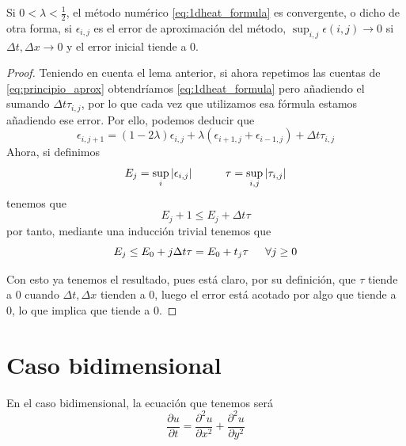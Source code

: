 \begin{teorema}
	Si $0<\lambda<\frac{1}{2}$, el método numérico \ref{eq:1dheat_formula} es convergente, o dicho de otra forma, si $\epsilon_{i,j}$ es el error de aproximación del método, $\sup_{i,j}\epsilon(i,j)\rightarrow0$ si $\Delta t, \Delta x \rightarrow 0$ y el error inicial tiende a 0.
\end{teorema}



\begin{proof}
	Teniendo en cuenta el lema anterior, si ahora repetimos las cuentas de \ref{eq:principio_aprox} obtendríamos \ref{eq:1dheat_formula} pero añadiendo el sumando $\Delta t\tau_{i,j}$, por lo que cada vez que utilizamos esa fórmula estamos añadiendo ese error. Por ello, podemos deducir que
	\begin{equation*}
		\epsilon_{i,j+1} = (1-2\lambda)\epsilon_{i,j}+\lambda(\epsilon_{i+1,j}+\epsilon_{i-1,j})+ \Delta t\tau_{i,j}
	\end{equation*}
	Ahora, si definimos
	\begin{equation*}
		E_j=\sup_{i}|\epsilon_{i,j}|\hspace{30px}\tau=\sup_{i,j}|\tau_{i,j}|
	\end{equation*}
	tenemos que
	\begin{equation*}
		E_j+1\leq E_j+\Delta t\tau
	\end{equation*}
	por tanto, mediante una inducción trivial tenemos que
	\begin{equation*}
		E_j \leq E_0 + j\Delta t\tau = E_0+t_j\tau\hspace{15px}\forall j\geq0
	\end{equation*}
	
	Con esto ya tenemos el resultado, pues está claro, por su definición, que $\tau$ tiende a 0 cuando $\Delta t, \Delta x$ tienden a 0, luego el error está acotado por algo que tiende a 0, lo que implica que tiende a 0.
\end{proof}

\section{Caso bidimensional}

En el caso bidimensional, la ecuación que tenemos será
\begin{equation}\label{eq:2dheat}
	\frac{\partial u}{\partial t}=\frac{\partial^2u}{\partial x^2}+\frac{\partial^2u}{\partial y^2}
\end{equation}





